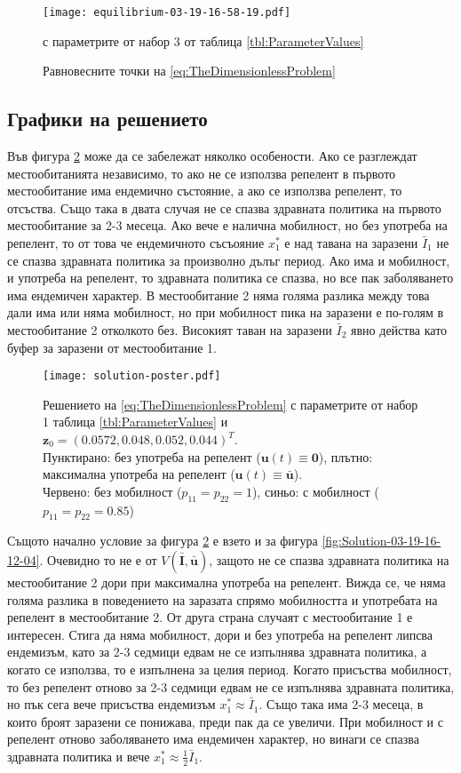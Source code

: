 \begin{figure}[H]
  \centering
  \texttt{[image: equilibrium-03-19-16-58-19.pdf]}
  \caption{Равновесните точки на \eqref{eq:TheDimensionlessProblem}} с параметрите от набор 3 от таблица \ref{tbl:ParameterValues}
  \label{fig:EquilibriumPoints-03-19-16-58-19}
\end{figure}

\subsection{Графики на решението}
Във фигура \ref{fig:Solution-poster} може да се забележат няколко особености.
Ако се разглеждат местообитанията независимо, то ако не се използва репелент в първото местообитание има ендемично състояние, а ако се използва репелент, то отсъства.
Също така в двата случая не се спазва здравната политика на първото местообитание за 2-3 месеца.
Ако вече е налична мобилност, но без употреба на репелент, то от това че ендемичното съсъояние $x_1^*$ е над тавана на заразени $\bar{I}_1$ не се спазва здравната политика за произволно дълъг период.
Ако има и мобилност, и употреба на репелент, то здравната политика се спазва, но все пак заболяването има ендемичен характер.
В местообитание 2 няма голяма разлика между това дали има или няма мобилност, но при мобилност пика на заразени е по-голям в местообитание 2 отколкото без. Високият таван на заразени $\bar{I}_2$ явно действа като буфер за заразени от местообитание 1.

\begin{figure}[H]
  \centering
  \texttt{[image: solution-poster.pdf]}
  \caption{Решението на \eqref{eq:TheDimensionlessProblem} с параметрите от набор 1 таблица \ref{tbl:ParameterValues} и $\mathbf{z}_0=(0.0572, 0.048, 0.052, 0.044)^T$.\\
    Пунктирано: без употреба на репелент ($\mathbf{u}(t) \equiv \mathbf{0}$), плътно: максимална употреба на репелент ($\mathbf{u}(t) \equiv \bar{\mathbf{u}}$).\\
  Червено: без мобилност ($p_{11}=p_{22}=1$), синьо: с мобилност ($p_{11}=p_{22}=0.85$)}
  \label{fig:Solution-poster}
\end{figure}

Същото начално условие за фигура \ref{fig:Solution-poster} е взето и за фигура \ref{fig:Solution-03-19-16-12-04}.
Очевидно то не е от $V(\bar{\mathbf{I}}, \bar{\mathbf{u}})$, защото не се спазва здравната политика на местообитание 2 дори при максимална употреба на репелент.
Вижда се, че няма голяма разлика в поведението на заразата спрямо мобилността и употребата на репелент в местообитание 2.
От друга страна случаят с местообитание 1 е интересен.
Стига да няма мобилност, дори и без употреба на репелент липсва ендемизъм, като за 2-3 седмици едвам не се изпълнява здравната политика, а когато се използва, то е изпълнена за целия период.
Когато присъства мобилност, то без репелент отново за 2-3 седмици едвам не се изпълнява здравната политика, но пък сега вече присъства ендемизъм $x_1^* \approx \bar{I}_1$.
Също така има 2-3 месеца, в които броят заразени се понижава, преди пак да се увеличи.
При мобилност и с репелент отново заболяването има ендемичен характер, но винаги се спазва здравната политика и вече $x_1^* \approx \frac{1}{2}\bar{I}_1$.

